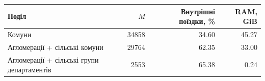 \begin{tabularx}{\linewidth}{Xrrr}\toprule
Поділ & $M$ & Внутрішні поїздки, \% & RAM, GiB\\\midrule
Комуни & 34858 & 34.60 & 45.27\\
Агломерації + сільські комуни & 29764 & 62.35 & 33.00\\
Агломерації + сільські групи департаментів & 2553 & 65.38 & 0.24\\
\bottomrule\end{tabularx}
